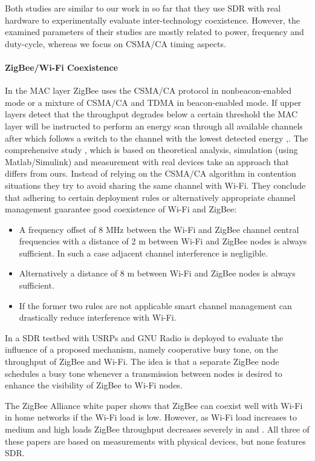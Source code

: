 Both studies are similar to our work in so far that they use SDR with real hardware to experimentally evaluate inter-technology coexistence. However, the examined parameters of their studies are mostly related to power, frequency and duty-cycle, whereas we focus on CSMA/CA timing aspects.

\paragraph{ZigBee/Wi-Fi Coexistence}

In the MAC layer ZigBee uses the CSMA/CA protocol in nonbeacon-enabled mode or a mixture of CSMA/CA and TDMA in beacon-enabled mode. If upper layers detect that the throughput degrades below a certain threshold the MAC layer will be instructed to perform an energy scan through all available channels after which follows a switch to the channel with the lowest detected energy \cite{yi11},\cite{zhang11}. 
The comprehensive study \cite{yi11}, which is based on theoretical analysis, simulation (using Matlab/Simulink) and measurement with real devices take an approach that differs from ours. Instead of relying on the CSMA/CA algorithm in contention situations they try to avoid sharing the same channel with Wi-Fi. They conclude that adhering to certain deployment rules or alternatively appropriate channel management guarantee good coexistence of Wi-Fi and ZigBee:
\begin{itemize}
	\item A frequency offset of 8 MHz between the Wi-Fi and ZigBee channel central frequencies with a distance of 2 m between Wi-Fi and ZigBee nodes is always sufficient. In such a case adjacent channel interference is negligible.
	\item Alternatively a distance of 8 m between Wi-Fi and ZigBee nodes is always sufficient.
	\item If the former two rules are not applicable smart channel management can drastically reduce interference with Wi-Fi.
\end{itemize}

In \cite{zhang11} a SDR testbed with USRPs and GNU Radio is deployed to evaluate the influence of a proposed mechanism, namely cooperative busy tone, on the throughput of ZigBee and Wi-Fi. The idea is that a separate ZigBee node schedules a busy tone whenever a transmission between nodes is desired to enhance the visibility of ZigBee to Wi-Fi nodes.

The ZigBee Alliance white paper \cite{thonet08} shows that ZigBee can coexist well with Wi-Fi in home networks if the Wi-Fi load is low. However, as Wi-Fi load increases to medium and high loads ZigBee throughput decreases severely in \cite{gummadi09} and \cite{polin08}. All three of these papers are based on measurements with physical devices, but none features SDR.

